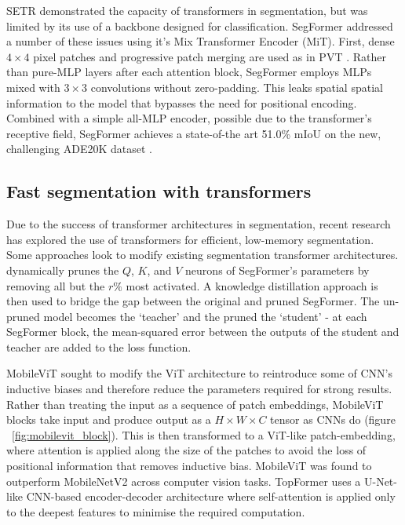 \documentclass[a4paper,12pt]{report}
\begin{document}
    SETR demonstrated the capacity of transformers in segmentation, but was limited by its use of a backbone designed for classification. SegFormer \cite{xie_segformer_2021} addressed a number of these issues using it’s Mix Transformer Encoder (MiT). First, dense $4 \times 4$ pixel patches and progressive patch merging are used as in PVT \cite{wang_pyramid_2021}. Rather than pure-MLP layers after each attention block, SegFormer employs MLPs mixed with $3 \times 3$ convolutions without zero-padding. This leaks spatial spatial information to the model that bypasses the need for positional encoding. Combined with a simple all-MLP encoder, possible due to the transformer’s receptive field, SegFormer achieves a state-of-the art 51.0\% mIoU on the new, challenging ADE20K dataset \cite{zhou_semantic_2018}.
    
    \subsection{Fast segmentation with transformers}
    Due to the success of transformer architectures in segmentation, recent research has explored the use of transformers for efficient, low-memory segmentation. Some approaches look to modify existing segmentation transformer architectures. \cite{bai_dynamically_2021} dynamically prunes the $Q$, $K$, and $V$ neurons of SegFormer’s \cite{xie_segformer_2021} parameters by removing all but the $r\%$ most activated. A knowledge distillation \cite{chen_learning_2017} approach is then used to bridge the gap between the original and pruned SegFormer. The un-pruned model becomes the ‘teacher’ and the pruned the ‘student’ - at each SegFormer block, the mean-squared error between the outputs of the student and teacher are added to the loss function.
    
    MobileViT \cite{mehta_mobilevit_2022} sought to modify the ViT architecture to reintroduce some of CNN's inductive biases and therefore reduce the parameters required for strong results. Rather than treating the input as a sequence of patch embeddings, MobileViT blocks take input and produce output as a $H \times W \times C$ tensor as CNNs do (figure ~\ref{fig:mobilevit_block}). This is then transformed to a ViT-like patch-embedding, where attention is applied along the size of the patches to avoid the loss of positional information that removes inductive bias. MobileViT was found to outperform MobileNetV2 across computer vision tasks. TopFormer \cite{zhang_topformer_2022} uses a U-Net-like \cite{ronneberger_u-net_2015} CNN-based encoder-decoder architecture where self-attention is applied only to the deepest features to minimise the required computation.
    
\end{document}
